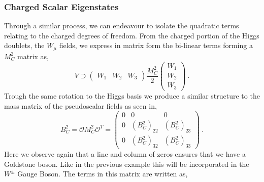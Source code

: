 \documentclass[10pt]{book}
\renewcommand{\(}{\left(}
\renewcommand{\)}{\right)}
\renewcommand{\[}{\left[}
\renewcommand{\]}{\right]}
\begin{document}
\subsubsection{Charged Scalar Eigenstates}

Through a similar process, we can endeavour to isolate the quadratic terms relating to the charged degrees of freedom. From the charged portion of the Higgs doublets, the $W_\mu$ fields, we express in matrix form the bi-linear terms forming a $M_C^2$ matrix as, 
%
\begin{equation}
V \supset \left( \begin{array}{ccc} 
W_1 & W_2 & W_3 
\end{array} \right) 
\frac{M_C^2}{2} \left( \begin{array}{c}
W_1 \\ 
W_2 \\
W_3
\end{array} \right) \ .
\end{equation}
Trough the same rotation to the Higgs basis we produce a similar structure to the mass matrix of the pseudoscalar fields as seen in,  
%
%
\begin{equation}
\label{eq:3HDM_Charged_M1}
B^2_C = \mathcal{O} M_C^2 \mathcal{O}^T = \left( \begin{array}{ccc}
0 & 0 & 0 \\ 
0 & \left( B^2_C \right)_{22} &  \left( B^2_C \right)_{23} \\
0 & \left( B^2_C \right)_{32} &  \left( B^2_C \right)_{33}
\end{array} \right) \ .
\end{equation}
%
Here we observe again that a line and column of zeros ensures that we have a Goldstone boson. Like in the previous example this will be incorporated in the $W^\pm$ Gauge Boson. The terms in this matrix are written as,
%
%
%
\end{document}
